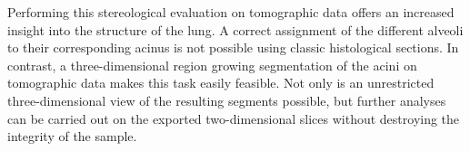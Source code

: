 Performing this stereological evaluation on tomographic data offers an increased insight into the structure of the lung. A correct assignment of the different alveoli to their corresponding acinus is not possible using classic histological sections. In contrast, a three-dimensional region growing segmentation of the acini on tomographic data makes this task easily feasible. Not only is an unrestricted three-dimensional view of the resulting segments possible, but further analyses can be carried out on the exported two-dimensional slices without destroying the integrity of the sample.

